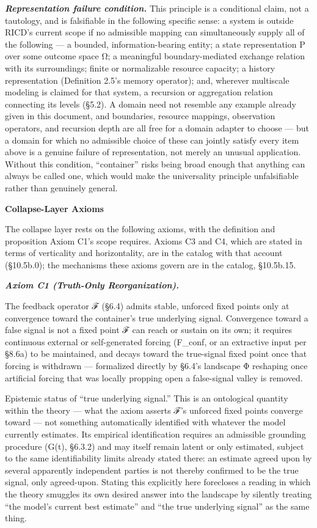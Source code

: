 \documentclass[
]{article}
\begin{document}
\emph{\textbf{Representation failure condition.}} This principle is a
conditional claim, not a tautology, and is falsifiable in the following
specific sense: a system is outside RICD's current scope if no
admissible mapping can simultaneously supply all of the following --- a
bounded, information-bearing entity; a state representation P over some
outcome space Ω; a meaningful boundary-mediated exchange relation with
its surroundings; finite or normalizable resource capacity; a history
representation (Definition 2.5's memory operator); and, wherever
multiscale modeling is claimed for that system, a recursion or
aggregation relation connecting its levels (§5.2). A domain need not
resemble any example already given in this document, and boundaries,
resource mappings, observation operators, and recursion depth are all
free for a domain adapter to choose --- but a domain for which no
admissible choice of these can jointly satisfy every item above is a
genuine failure of representation, not merely an unusual application.
Without this condition, ``container'' risks being broad enough that
anything can always be called one, which would make the universality
principle unfalsifiable rather than genuinely general.

\textbf{Collapse-Layer Axioms}

The collapse layer rests on the following axioms, with the definition
and proposition Axiom C1's scope requires. Axioms C3 and C4, which are
stated in terms of verticality and horizontality, are in the catalog
with that account (§10.5b.0); the mechanisms these axioms govern are in
the catalog, §10.5b.15.

\emph{\textbf{Axiom C1 (Truth-Only Reorganization).}}

The feedback operator ℱ (§6.4) admits stable, unforced fixed points only
at convergence toward the container's true underlying signal.
Convergence toward a false signal is not a fixed point ℱ can reach or
sustain on its own; it requires continuous external or self-generated
forcing (F\_conf, or an extractive input per §8.6a) to be maintained,
and decays toward the true-signal fixed point once that forcing is
withdrawn --- formalized directly by §6.4's landscape Φ reshaping once
artificial forcing that was locally propping open a false-signal valley
is removed.

Epistemic status of ``true underlying signal.'' This is an ontological
quantity within the theory --- what the axiom asserts ℱ's unforced fixed
points converge toward --- not something automatically identified with
whatever the model currently estimates. Its empirical identification
requires an admissible grounding procedure (G(t), §6.3.2) and may itself
remain latent or only estimated, subject to the same identifiability
limits already stated there: an estimate agreed upon by several
apparently independent parties is not thereby confirmed to be the true
signal, only agreed-upon. Stating this explicitly here forecloses a
reading in which the theory smuggles its own desired answer into the
landscape by silently treating ``the model's current best estimate'' and
``the true underlying signal'' as the same thing.
\end{document}
